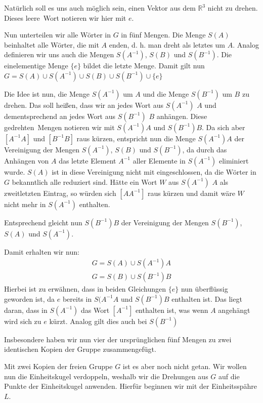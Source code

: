 \documentclass[10pt]{article}
\begin{document}
\noindent Natürlich soll es uns auch möglich sein, einen Vektor aus dem $\mathbb{R}^3$ nicht zu drehen. Dieses \glqq leere\grqq~Wort notieren wir hier mit $e$.

\noindent Nun unterteilen wir alle Wörter in $G$ in fünf Mengen. Die Menge $S(A)$ beinhaltet alle Wörter, die mit $A$ enden, d. h. man dreht als letztes um $A$. Analog definieren wir uns auch die Mengen $S(A^{-1})$, $S(B)$ und $S(B^{-1})$. Die einelementige Menge $\{e\}$ bildet die letzte Menge. Damit gilt nun $G=S(A)\cup S(A^{-1})\cup S(B)\cup S(B^{-1})\cup \{e\}$

\noindent Die Idee ist nun, die Menge $S(A^{-1})$ um $A$ und die Menge $S(B^{-1})$ um $B$ zu \glqq drehen\grqq. Das soll heißen, dass wir an jedes Wort aus $S(A^{-1})$ $A$ und dementsprechend an jedes Wort aus $S(B^{-1})$ $B$ anhängen. Diese \glqq gedrehten\grqq~Mengen notieren wir mit $S(A^{-1})A$ und $S(B^{-1})B$. Da sich aber $[ A^{-1}A ]$ und $[ B^{-1}B ]$ raus kürzen, entspricht nun die Menge $S(A^{-1})A$ der Vereinigung der Mengen $S(A^{-1})$, $S(B)$ und $S(B^{-1})$, da durch das Anhängen von $A$ das letzte Element $A^{-1}$ aller Elemente in $S(A^{-1})$ eliminiert wurde. $S(A)$ ist in diese Vereinigung nicht mit eingeschlossen, da die Wörter in $G$ bekanntlich alle reduziert sind. Hätte ein Wort $W$ aus $S(A^{-1})$ $A$ als zweitletzten Eintrag, so würden sich $[ AA^{-1} ]$ raus kürzen und damit wäre $W$ nicht mehr in $S(A^{-1})$ enthalten.\par

\noindent Entsprechend gleicht nun $S(B^{-1})B$ der Vereinigung der Mengen $S(B^{-1})$, $S(A)$ und $S(A^{-1})$.

\noindent Damit erhalten wir nun: 
\begin{align*}\label{Eq1}
 G=S(A)\cup S(A^{-1})A\\
 G=S(B)\cup S(B^{-1})B   
\end{align*}
\noindent Hierbei ist zu erwähnen, dass in beiden Gleichungen $\{e\}$ nun überflüssig geworden ist, da $e$ bereits in $S(A^{-1}A$ und $S(B^{-1})B$ enthalten ist. Das liegt daran, dass in $S(A^{-1})$ das Wort $[ A^{-1} ]$ enthalten ist, was wenn $A$ angehängt wird sich zu $e$ kürzt. Analog gilt dies auch bei $S(B^{-1})$ 

\noindent Insbesondere haben wir nun vier der ursprünglichen fünf Mengen zu zwei identischen Kopien der Gruppe zusammengefügt.

\noindent Mit zwei Kopien der freien Gruppe $G$ ist es aber noch nicht getan. Wir wollen nun die Einheitskugel verdoppeln, weshalb wir die Drehungen aus $G$ auf die Punkte der Einheitskugel anwenden. Hierfür beginnen wir mit der Einheitsspähre $L$.\par
\end{document}

